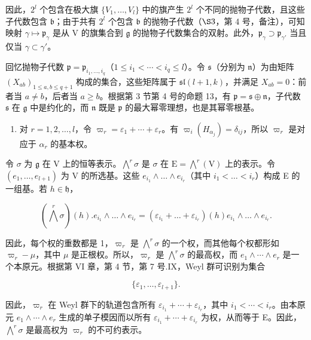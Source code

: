 因此，\(2^{l}\) 个包含在极大旗 \(\{V_{1},\ldots,V_{l}\}\) 中的旗产生 \(2^{l}\) 个不同的抛物子代数，且这些子代数包含 \(\mathfrak{b}\)；由于共有 \(2^{l}\) 个包含 \(\mathfrak{b}\) 的抛物子代数（\(\S3\)，第 4 号，备注），可知映射 \(\gamma\mapsto \mathfrak{p}_{\gamma}\) 是从 V 的旗集合到 \(\mathfrak{g}\) 的抛物子代数集合的双射。此外，\(\mathfrak{p}_{\gamma}\supset \mathfrak{p}_{\gamma'}\) 当且仅当 \(\gamma\subset\gamma'\)。

回忆抛物子代数 \(\mathfrak{p} = \mathfrak{p}_{i_1, \ldots, i_q}\)（\(1 \leq i_1 < \cdots < i_q \leq l\)）。令 \(\mathfrak{s}\)（分别为 \(\mathfrak{n}\)）为由矩阵 \((X_{ab})_{1 \leq a, b \leq q+1}\) 构成的集合，这些矩阵属于 \(\mathfrak{sl}(l+1, k)\)，并满足 \(X_{ab} = 0\)：前者当 \(a \neq b\)，后者当 \(a \geq b\)。根据第 3 节第 4 号的命题 13，有 \(\mathfrak{p} = \mathfrak{s} \oplus \mathfrak{n}\)，子代数 \(\mathfrak{s}\) 在 \(\mathfrak{g}\) 中是约化的，而 \(\mathfrak{n}\) 既是 \(\mathfrak{p}\) 的最大幂零理想，也是其幂零根基。

\begin{enumerate}
\def\labelenumi{(\Roman{enumi})}
\setcounter{enumi}{3}
\tightlist
\item
  对 \(r = 1, 2, \ldots, l\)，令 \(\varpi_{r} = \varepsilon_{1} + \cdots + \varepsilon_{r}\)。有 \(\varpi_{i}(H_{\alpha_{j}}) = \delta_{ij}\)，所以 \(\varpi_{r}\) 是对应于 \(\alpha_{r}\) 的基本权。
\end{enumerate}

令 \(\sigma\) 为 \(\mathfrak{g}\) 在 V 上的恒等表示。\(\bigwedge^{r}\sigma\) 是 \(\sigma\) 在 \(\mathrm{E} = \bigwedge^{r}(\mathrm{V})\) 上的表示。令 \((e_1,\ldots ,e_{l + 1})\) 为 V 的所选基。这些 \(e_{i_1}\wedge \dots \wedge e_{i_r}\)（其中 \(i_1 < \dots < i_r\)）构成 E 的一组基。若 \(h\in \mathfrak{h}\)，

\[
(\bigwedge^ {r} \sigma) (h). e _ {i _ {1}} \wedge \dots \wedge e _ {i _ {r}} = (\varepsilon_ {i _ {1}} + \dots + \varepsilon_ {i _ {r}}) (h) e _ {i _ {1}} \wedge \dots \wedge e _ {i _ {r}}.
\]

因此，每个权的重数都是 1，\(\varpi_{r}\) 是 \(\bigwedge^{r}\sigma\) 的一个权，而其他每个权都形如 \(\varpi_{r}-\mu\)，其中 \(\mu\) 是正根权。所以，\(\varpi_{r}\) 是 \(\bigwedge^{r}\sigma\) 的最高权，而 \(e_{1}\wedge\cdots\wedge e_{r}\) 是一个本原元。根据第 VI 章，第 4 节，第 7 号.IX，Weyl 群可识别为集合

\[
\{\varepsilon_ {1}, \dots , \varepsilon_ {l + 1} \}.
\]

因此，\(\varpi_{r}\) 在 Weyl 群下的轨道包含所有 \(\varepsilon_{i_{1}} + \cdots + \varepsilon_{i_{r}}\)，其中 \(i_{1} < \cdots < i_{r}\)。由本原元 \(e_{1} \wedge \cdots \wedge e_{r}\) 生成的单子模因而以所有 \(\varepsilon_{i_{1}} + \cdots + \varepsilon_{i_{r}}\) 为权，从而等于 E。因此，\(\bigwedge^{r} \sigma\) 是最高权为 \(\varpi_{r}\) 的不可约表示。

